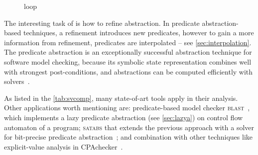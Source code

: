 \begin{figure}[h]
\caption{\cegar loop}
\label{fig:cegar}
\end{figure}

The interesting task of \cegar is how to refine abstraction. In predicate
abstraction-based techniques, a refinement introduces new predicates, however to
gain a more information from refinement, predicates are interpolated
\cite{Jhala2006} -- see \autoref{sec:interpolation}. The predicate abstraction
is an exceptionally successful abstraction technique for software model
checking, because its symbolic state representation combines well with
strongest post-conditions, and abstractions can be computed efficiently with
\smt solvers~\cite{Beyer2013}.

As listed in the \autoref{tab:svcomp}, many state-of-art tools apply \cegar in
their analysis. Other applications worth mentioning are: predicate-based model
checker \textsc{blast}~\cite{Henzinger2003, Beyer2005checking}, which
implements a lazy predicate abstraction (see \autoref{sec:lazya}) on control
flow automaton of a program; \textsc{satabs} that extends the previous approach
with a \sat solver for bit-precise predicate abstraction~\cite{Clarke2005satabs};
and combination with other techniques like explicit-value analysis in
CPAchecker~\cite{Beyer2013, Beyer2018e}.

